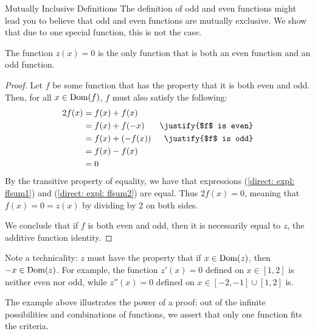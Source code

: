 \documentclass[../proofs.tex]{subfiles}
\begin{document}
\begin{expl}{Mutually Inclusive Definitions}
The definition of odd and even functions might lead you to believe that odd and
even functions are mutually exclusive. We show that due to one special
function, this is not the case.

\begin{claim} The function $z(x) = 0$ is the only function that is both an even
  function and an odd function.
\end{claim}
\begin{proof}
  Let $f$ be some function that has the property that it is both even and odd.
  Then, for all $x \in \operatorname{Dom}(f)$, $f$ must also satisfy the following:
  \begin{align}
    2f(x) \label{direct: expl: ffsum1}
      &= f(x) + f(x) \\
      &= f(x) + f(-x) & \justify{$f$ is even} \\
      &= f(x) + (-f(x)) & \justify{$f$ is odd} \\
      &= f(x) - f(x) \\
      &= 0 \label{direct: expl: ffsum2}
  \end{align}
  By the transitive property of equality, we have that expressions
  (\ref{direct: expl: ffsum1}) and (\ref{direct: expl: ffsum2}) are equal. Thus
  $2f(x) = 0$, meaning that $f(x) = 0 = z(x)$ by dividing by 2 on both sides.


  We conclude that if $f$ is both even and odd, then it is necessarily equal
  to $z$, the additive function identity.
\end{proof}

Note a technicality: $z$ must have the property that if $x \in \operatorname{Dom}(z)$, then
$-x \in \operatorname{Dom}(z)$. For example, the function $z'(x) = 0$ defined
on $x \in [1, 2]$ is neither even nor odd, while $z''(x) = 0$ defined on
$x \in [-2, -1] \cup [1, 2]$ is.
\end{expl}

The example above illustrates the power of a proof: out of the infinite
possibilities and combinations of functions, we assert that only one function
fits the criteria.
\end{document}
